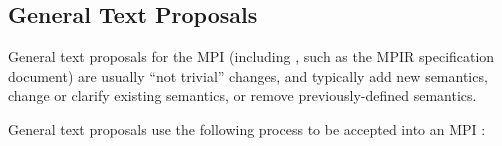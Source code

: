 
\subsection{General Text Proposals}
\label{subsec:general-text-proposals}

General text proposals for the MPI {\color{red}{Standard Document}} (including
{\color{red}{MPI Companion Documents}}, such as the MPIR specification
document) are usually ``not trivial'' changes, and typically add new
semantics, change or clarify existing semantics, or remove
previously-defined semantics.

General text proposals use the following process to be accepted into
an MPI {\color{red}{Standard Document}}:

